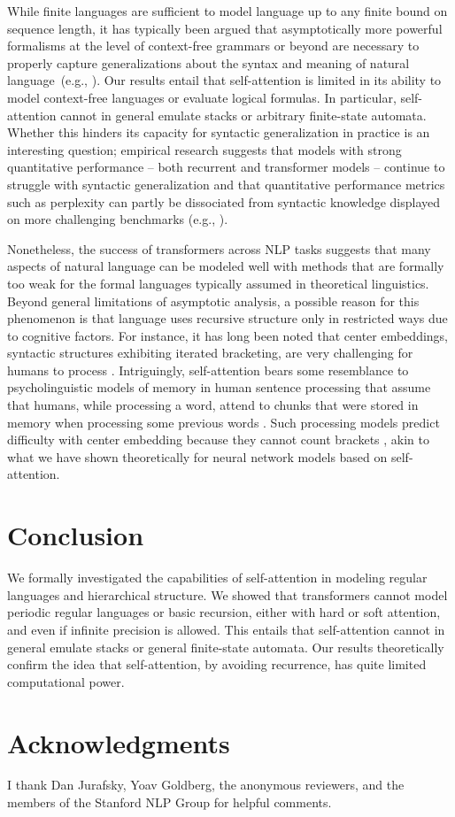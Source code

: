 \documentclass[11pt,a4paper]{article}
\begin{document}
While finite languages are sufficient to model language up to any finite bound on sequence length, it has typically been argued that asymptotically more powerful formalisms at the level of context-free grammars or beyond are necessary to properly capture generalizations about the syntax and meaning of natural language~(e.g., \citet{chomsky1957syntactic,shieber1985evidence}).
Our results entail that self-attention is limited in its ability to model context-free languages or evaluate logical formulas.
In particular, self-attention cannot in general emulate stacks or arbitrary finite-state automata.
Whether this hinders its capacity for syntactic generalization in practice is an interesting question; empirical research suggests that models with strong quantitative performance -- both recurrent and transformer models -- continue to struggle with syntactic generalization and that quantitative performance metrics such as perplexity can partly be dissociated from syntactic knowledge displayed on more challenging benchmarks (e.g., \citet{kuncoro2018lstms,marvin2018targeted, tran2018importance,mccoy2019berts}).

Nonetheless, the success of transformers across NLP tasks suggests that many aspects of natural language can be modeled well with methods that are formally too weak for the formal languages typically assumed in theoretical linguistics.
Beyond general limitations of asymptotic analysis, a possible reason for this phenomenon is that language uses recursive structure only in restricted ways due to cognitive factors.
For instance, it has long been noted that center embeddings, syntactic structures exhibiting iterated bracketing, are very challenging for humans to process \cite{miller-finitary-1963,gibson1999memory}.
Intriguingly, self-attention bears some resemblance to psycholinguistic models of memory in human sentence processing that assume that humans, while processing a word, attend to chunks that were stored in memory when processing some previous words \cite{lewis2005activation,parker2017cue}.
Such processing models predict difficulty with center embedding because they cannot count brackets \cite{lewis2005activation}, akin to what we have shown theoretically for neural network models based on self-attention.





\section{Conclusion}
We formally investigated the capabilities of self-attention in modeling regular languages and hierarchical structure.
We showed that transformers cannot model periodic regular languages or basic recursion, either with hard or soft attention, and even if infinite precision is allowed. %
This entails that self-attention cannot in general emulate stacks or general finite-state automata.
Our results theoretically confirm the idea that self-attention, by avoiding recurrence, has quite limited computational power.


\section*{Acknowledgments}
I thank Dan Jurafsky, Yoav Goldberg, the anonymous reviewers, and the members of the Stanford NLP Group for helpful comments.



\end{document}
